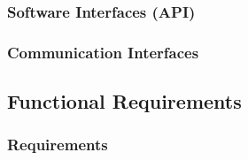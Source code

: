 \documentclass[english]{article}
\begin{document}
\subsubsection{Software Interfaces (API)}

\subsubsection{Communication Interfaces}

\newpage
\subsection{Functional Requirements}

\subsubsection{Requirements}
\end{document}
